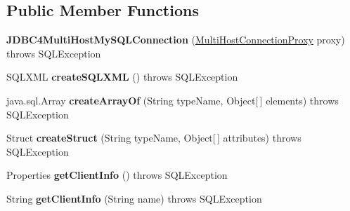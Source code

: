 \subsection*{Public Member Functions}
\begin{DoxyCompactItemize}
\item 
\mbox{\label{classcom_1_1mysql_1_1jdbc_1_1_j_d_b_c4_multi_host_my_s_q_l_connection_a7aa0470f869183aa779a311bd6bc6f06}} 
{\bfseries J\+D\+B\+C4\+Multi\+Host\+My\+S\+Q\+L\+Connection} (\mbox{\hyperlink{classcom_1_1mysql_1_1jdbc_1_1_multi_host_connection_proxy}{Multi\+Host\+Connection\+Proxy}} proxy)  throws S\+Q\+L\+Exception 
\item 
\mbox{\label{classcom_1_1mysql_1_1jdbc_1_1_j_d_b_c4_multi_host_my_s_q_l_connection_a711b19539e554e55814dc84ec4edbe3d}} 
S\+Q\+L\+X\+ML {\bfseries create\+S\+Q\+L\+X\+ML} ()  throws S\+Q\+L\+Exception 
\item 
\mbox{\label{classcom_1_1mysql_1_1jdbc_1_1_j_d_b_c4_multi_host_my_s_q_l_connection_a8535c0558643a7d6b6071a6effda3e3f}} 
java.\+sql.\+Array {\bfseries create\+Array\+Of} (String type\+Name, Object\mbox{[}$\,$\mbox{]} elements)  throws S\+Q\+L\+Exception 
\item 
\mbox{\label{classcom_1_1mysql_1_1jdbc_1_1_j_d_b_c4_multi_host_my_s_q_l_connection_aba25ef9c57f0d13b4c2160e347a3a663}} 
Struct {\bfseries create\+Struct} (String type\+Name, Object\mbox{[}$\,$\mbox{]} attributes)  throws S\+Q\+L\+Exception 
\item 
\mbox{\label{classcom_1_1mysql_1_1jdbc_1_1_j_d_b_c4_multi_host_my_s_q_l_connection_af665e41b9d504ac9222ca9f98d188350}} 
Properties {\bfseries get\+Client\+Info} ()  throws S\+Q\+L\+Exception 
\item 
\mbox{\label{classcom_1_1mysql_1_1jdbc_1_1_j_d_b_c4_multi_host_my_s_q_l_connection_a374f74375464830f67505958ff3ccc6b}} 
String {\bfseries get\+Client\+Info} (String name)  throws S\+Q\+L\+Exception 

\end{DoxyCompactItemize}
